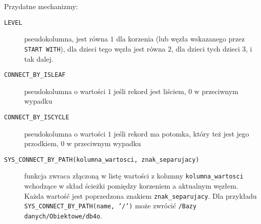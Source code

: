 % 


Przydatne mechanizmy:
\begin{description}
    \item[\texttt{LEVEL}] 
        pseudokolumna,
        jest równa $1$ dla korzenia (lub węzła wskazanego przez \texttt{START WITH}), 
        dla dzieci tego węzła jest równa $2$, dla dzieci tych dzieci $3$, i tak dalej. 
    \item[\texttt{CONNECT\_BY\_ISLEAF}] 
        pseudokolumna o wartości $1$ jeśli rekord jest liściem, $0$ w przeciwnym wypadku
    \item[\texttt{CONNECT\_BY\_ISCYCLE}]  
        pseudokolumna o wartości $1$ jeśli rekord ma potomka, który też jest jego przodkiem, $0$ w przeciwnym wypadku
    \item[\texttt{SYS\_CONNECT\_BY\_PATH(kolumna\_wartosci, znak\_separujacy)}] 
        funkcja zwraca złączoną w listę wartości 
        z kolumny \texttt{kolumna\_wartosci} wchodzące w skład ścieżki pomiędzy korzeniem a aktualnym węzłem.
        Każda wartość jest poprzedzona znakiem \texttt{znak\_separujacy}.
        Dla przykładu \texttt{SYS\_CONNECT\_BY\_PATH(name, '/')} może zwrócić \texttt{/Bazy danych/Obiektowe/db4o}.

\end{description}





